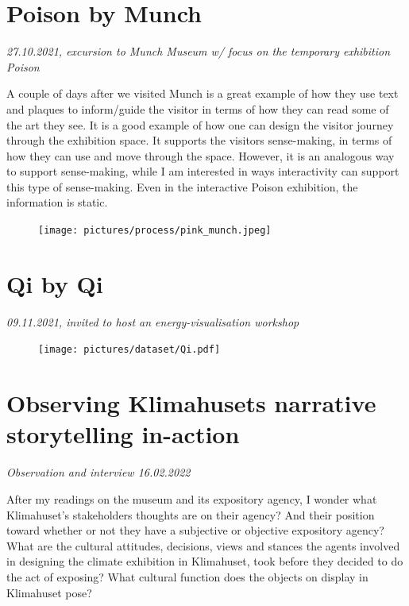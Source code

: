 \section{Poison by Munch}
\par
\emph{27.10.2021, excursion to Munch Museum w/ focus on the temporary exhibition Poison}
\par

A couple of days after we visited 
Munch is a great example of how they use text and plaques to inform/guide the visitor in terms of how they can read some of the art they see. It is a good example of how one can design the visitor journey through the exhibition space. It supports the visitors sense-making, in terms of how they can use and move through the space. However, it is an analogous way to support sense-making, while I am interested in ways interactivity can support this type of sense-making. Even in the interactive Poison exhibition, the information is static.

\begin{figure}[H]
\texttt{[image: pictures/process/pink\_munch.jpeg]}
\centering 
\end{figure}

\section{Qi by Qi}
\emph{09.11.2021, invited to host an energy-visualisation workshop}
\begin{figure}[H]
\texttt{[image: pictures/dataset/Qi.pdf]}
\centering 
\end{figure}



\section{Observing Klimahusets narrative storytelling in-action}
\par
\emph{Observation and interview 16.02.2022}
\par

After my readings on the museum and its expository agency, I wonder what Klimahuset’s stakeholders thoughts are on their agency? And their position toward whether or not they have a subjective or objective expository agency? What are the cultural attitudes, decisions, views and stances the agents involved in designing the climate exhibition in Klimahuset, took before they decided to do the act of exposing? What cultural function does the objects on display in Klimahuset pose? 

